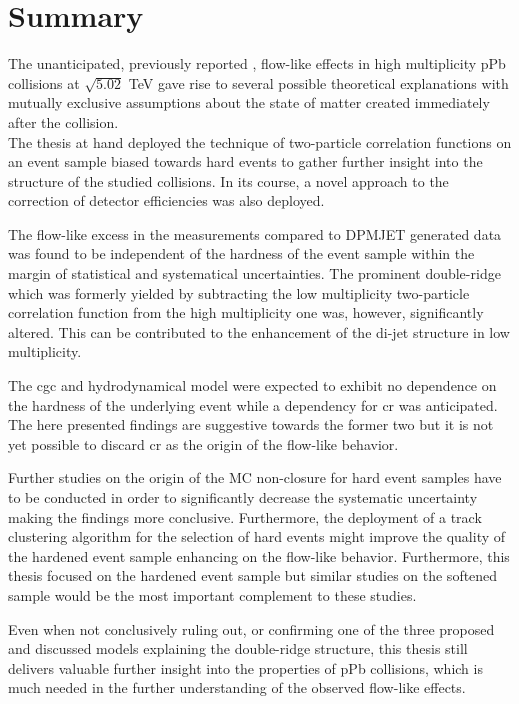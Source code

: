 
\chapter{Summary}
\label{chap:summary}

The unanticipated, previously reported \cite{Abelev2012,CMSCollaborationChatrchyan2013}, flow-like effects in high multiplicity \gls{pPb} collisions at $\sqrt{5.02}$ \si{TeV} gave rise to several possible theoretical explanations with mutually exclusive assumptions about the state of matter created immediately after the collision.\\

The thesis at hand deployed the technique of two-particle correlation functions on an event sample biased towards hard events to gather further insight into the structure of the studied collisions. In its course, a novel approach to the correction of detector efficiencies was also deployed.

The flow-like excess in the measurements compared to DPMJET generated data was found to be independent of the hardness of the event sample within the margin of statistical and systematical uncertainties. The prominent double-ridge which was formerly yielded by subtracting the low multiplicity two-particle correlation function from the high multiplicity one was, however, significantly altered. This can be contributed to the enhancement of the di-jet structure in low multiplicity.

The \gls{cgc} and hydrodynamical model were expected to exhibit no dependence on the hardness of the underlying event while a dependency for \gls{cr} was anticipated. The here presented findings are suggestive towards the former two but it is not yet possible to discard \gls{cr} as the origin of the flow-like behavior.

Further studies on the origin of the MC non-closure for hard event samples have to be conducted in order to significantly decrease the systematic uncertainty making the findings more conclusive. Furthermore, the deployment of a track clustering algorithm for the selection of hard events might improve the quality of the hardened event sample enhancing on the flow-like behavior. Furthermore, this thesis focused on the hardened event sample but similar studies on the softened sample would be the most important complement to these studies.

Even when not conclusively ruling out, or confirming one of the three proposed and discussed models explaining the double-ridge structure, this thesis still delivers valuable further insight into the properties of \gls{pPb} collisions, which is much needed in the further understanding of the observed flow-like effects.

